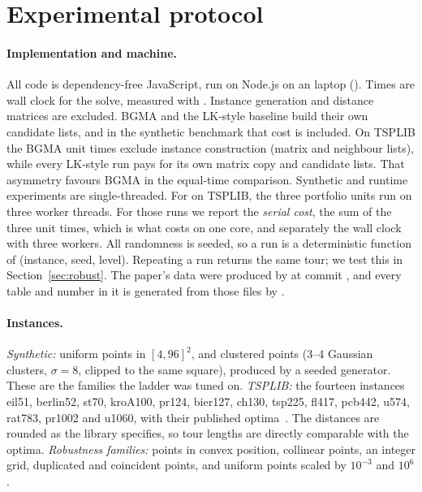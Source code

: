 \section{Experimental protocol}\label{sec:protocol}

\paragraph{Implementation and machine.}
All code is dependency-free JavaScript, run on Node.js \NodeVersion{} on an \CPU{} laptop
(\Platform). Times are wall clock for the solve, measured with . Instance
generation and distance matrices are excluded. BGMA and the LK-style baseline build their own
candidate lists, and in the synthetic benchmark that cost is included. On TSPLIB the BGMA unit
times exclude instance construction (matrix and neighbour lists), while every LK-style run pays for
its own matrix copy and candidate lists. That asymmetry favours BGMA in the equal-time comparison.
Synthetic and runtime experiments are single-threaded. For
 on TSPLIB, the three portfolio units run on three worker threads. For those runs we report
the \emph{serial cost}, the sum of the three unit times, which is what  costs on one core, and
separately the wall clock with three workers. All randomness is seeded, so a run is a deterministic
function of (instance, seed, level). Repeating a run returns the same tour; we test this in
Section~\ref{sec:robust}. The paper's data were produced by  at commit
\code{\Commit}, and every table and number in it is generated from those files by
.

\paragraph{Instances.}
\emph{Synthetic:} uniform points in $[4,96]^2$, and clustered points (3--4 Gaussian clusters,
$\sigma=8$, clipped to the same square), produced by a seeded generator. These are the families the
ladder was tuned on. \emph{TSPLIB:} the fourteen  instances eil51, berlin52, st70,
kroA100, pr124, bier127, ch130, tsp225, fl417, pcb442, u574, rat783, pr1002 and u1060, with their
published optima~\citep{reinelt1991}. The distances are rounded as the library specifies, so tour
lengths are directly comparable with the optima. \emph{Robustness families:} points in convex
position, collinear points, an integer grid, duplicated and coincident points, and uniform points
scaled by $10^{-3}$ and $10^{6}$.

